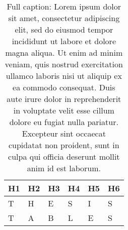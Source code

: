 \begin{table}[ht]
	\centering
	\caption[Content table caption]{Full caption: Lorem ipsum dolor sit amet, consectetur adipiscing elit, sed do eiusmod tempor incididunt ut labore et dolore magna aliqua. Ut enim ad minim veniam, quis nostrud exercitation ullamco laboris nisi ut aliquip ex ea commodo consequat. Duis aute irure dolor in reprehenderit in voluptate velit esse cillum dolore eu fugiat nulla pariatur. Excepteur sint occaecat cupidatat non proident, sunt in culpa qui officia deserunt mollit anim id est laborum.}
	\label{tab:my-table}
	\begin{tabular}{|l|l|l|l|l|l|}
		\hline
		\textbf{H1} & \textbf{H2} & \textbf{H3} & \textbf{H4} & \textbf{H5} & \textbf{H6} \\ \hline
		T           & H           & E           & S           & I           & S           \\ \hline
		T           & A           & B           & L           & E           & S           \\ \hline
	\end{tabular}
\end{table}